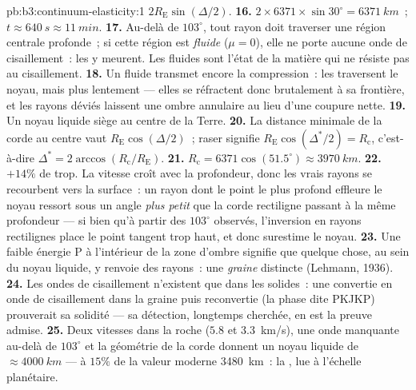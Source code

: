 \begin{solution}{pb:b3:continuum-elasticity:1}
$2R_{\text{E}}\sin(\Delta/2)$.
\textbf{16.} $2 \times 6371 \times \sin30^\circ = \qty{6371}{km}$~;
$t \approx \qty{640}{s} \approx \qty{11}{min}$.
\textbf{17.} Au-delà de $103^\circ$, tout rayon doit traverser une
région centrale profonde~; si cette région est \emph{fluide}
($\mu = 0$), elle ne porte aucune onde de cisaillement~: les  y
meurent. Les fluides sont l'état de la matière qui ne résiste pas au
cisaillement.
\textbf{18.} Un fluide transmet encore la compression~: les 
traversent le noyau, mais plus lentement --- elles se réfractent donc
brutalement à sa frontière, et les rayons déviés laissent une ombre
annulaire au lieu d'une coupure nette.
\textbf{19.} Un noyau liquide siège au centre de la Terre.
\textbf{20.} La distance minimale de la corde au centre vaut
$R_{\text{E}}\cos(\Delta/2)$~; raser signifie
$R_{\text{E}}\cos(\Delta^*/2) = R_{\text{c}}$, c'est-à-dire $\Delta^* =
2\arccos(R_{\text{c}}/R_{\text{E}})$.
\textbf{21.} $R_{\text{c}} = 6371\cos(51.5^\circ) \approx
\qty{3970}{km}$.
\textbf{22.} $+14\%$ de trop. La vitesse croît avec la profondeur,
donc les vrais rayons se recourbent vers la surface~: un rayon dont le
point le plus profond effleure le noyau ressort sous un angle
\emph{plus petit} que la corde rectiligne passant à la même profondeur
--- si bien qu'à partir des $103^\circ$ observés, l'inversion en rayons
rectilignes place le point tangent trop haut, et donc surestime le
noyau.
\textbf{23.} Une faible énergie P à l'intérieur de la zone d'ombre
signifie que quelque chose, au sein du noyau liquide, y renvoie des
rayons~: une \emph{graine} distincte (Lehmann, 1936).
\textbf{24.} Les ondes de cisaillement n'existent que dans les
solides~: une  convertie en onde de cisaillement dans la graine
puis reconvertie (la phase dite PKJKP) prouverait sa solidité --- sa
détection, longtemps cherchée, en est la preuve admise.
\textbf{25.} Deux vitesses dans la roche ($5.8$ et \qty{3.3}{km/s}),
une onde manquante au-delà de $103^\circ$ et la géométrie de la corde
donnent un noyau liquide de $\approx\qty{4000}{km}$ --- à $15\%$ de la
valeur moderne \qty{3480}{km}~: la , lue à l'échelle
planétaire.
\end{solution}
